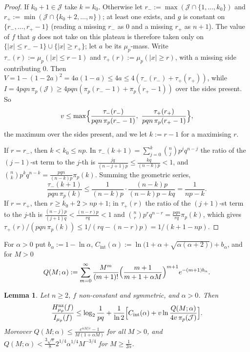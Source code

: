 \documentclass[11pt]{amsart}
\newtheorem{lemma}{Lemma}[section]
\theoremstyle{remark}
\newcommand{\J}{\mathcal{J}}
\begin{document}
\begin{proof}
If $k_0 + 1 \in \J$ take $k = k_0$. Otherwise let $r_- := \max(\J \cap \{1, \dots, k_0\})$ and $r_+ := \min(\J \cap \{k_0 + 2, \dots, n\})$; at least one exists, and $g$ is constant on $\{r_-, \dots, r_+ - 1\}$ (reading a missing $r_-$ as $0$ and a missing $r_+$ as $n+1$). The value of $f$ that $g$ does not take on this plateau is therefore taken only on $\{|x| \le r_- - 1\} \cup \{|x| \ge r_+\}$; let $a$ be its $\mu_p$-mass. Write $\tau_-(r) := \mu_p(|x| \le r - 1)$ and $\tau_+(r) := \mu_p(|x| \ge r)$, with a missing side contributing $0$. Then $V = 1 - (1 - 2a)^2 = 4a(1-a) \le 4a \le 4(\tau_-(r_-) + \tau_+(r_+))$, while $I = 4pqn\,\pi_p(\J) \ge 4pqn(\pi_p(r_- - 1) + \pi_p(r_+ - 1))$ over the sides present. So
\[
v \le \max\Bigl\{\frac{\tau_-(r_-)}{pqn\,\pi_p(r_- - 1)},\ \frac{\tau_+(r_+)}{pqn\,\pi_p(r_+ - 1)}\Bigr\},
\]
the maximum over the sides present, and we let $k := r - 1$ for a maximising $r$.

If $r = r_-$, then $k < k_0 \le np$. In $\tau_-(k+1) = \sum_{j=0}^{k}\binom{n}{j}p^jq^{n-j}$ the ratio of the $(j-1)$-st term to the $j$-th is $\frac{jq}{(n-j+1)p} \le \frac{kq}{(n-k)p} < 1$, and $\binom{n}{k}p^kq^{n-k} = \frac{pqn}{(n-k)p}\pi_p(k)$. Summing the geometric series,
\[
\frac{\tau_-(k+1)}{pqn\,\pi_p(k)} \le \frac{1}{(n-k)p}\cdot\frac{(n-k)p}{(n-k)p - kq} = \frac{1}{np - k}.
\]
If $r = r_+$, then $r \ge k_0 + 2 > np + 1$; in $\tau_+(r)$ the ratio of the $(j+1)$-st term to the $j$-th is $\frac{(n-j)p}{(j+1)q} < \frac{(n-r)p}{rq} < 1$ and $\binom{n}{r}p^rq^{n-r} = \frac{pqn}{rq}\pi_p(k)$, which gives $\tau_+(r)/(pqn\,\pi_p(k)) \le 1/(rq - (n-r)p) = 1/(k + 1 - np)$.
\end{proof}

For $\alpha > 0$ put $b_\alpha := 1 - \ln\alpha$, $C_{\mathrm{int}}(\alpha) := \ln\bigl(1 + \alpha + \sqrt{\alpha(\alpha+2)}\bigr) + b_\alpha$, and for $M > 0$
\begin{equation}\label{eq:Qpoi}
Q(M;\alpha) := \sum_{m=0}^\infty \frac{M^m}{(m+1)!}\Bigl(\frac{m+1}{m+1+\alpha M}\Bigr)^{m+1}e^{-(m+1)b_\alpha}.
\end{equation}

\begin{lemma}\label{lem:poi}
Let $n \ge 2$, $f$ non-constant and symmetric, and $\alpha > 0$. Then
\begin{equation}\label{eq:gibbs}
\frac{H^{\mathrm{nz}}_{\mu_p}(f)}{I_{\mu_p}(f)} \le \log_2\frac{1}{pq} + \frac{1}{\ln 2}\Bigl[C_{\mathrm{int}}(\alpha) + v\ln\frac{Q(M;\alpha)}{4v\,\pi_p(\J)}\Bigr].
\end{equation}
Moreover $Q(M;\alpha) \le \frac{e^{\alpha M/e} - 1}{M(1 + \alpha M)}$ for all $M > 0$, and $Q(M;\alpha) < \frac{3\sqrt\pi}{8}2^{1/4}\alpha^{1/4}M^{-3/4}$ for $M \ge \frac{1}{2\alpha}$.
\end{lemma}
\end{document}
